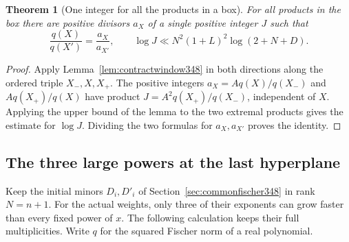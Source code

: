 \documentclass[a4paper,11pt]{article}
\newtheorem{theorem}[proposition]{Theorem}
\theoremstyle{definition}
\theoremstyle{remark}
\numberwithin{equation}{section}
\begin{document}
\begin{theorem}[One integer for all the products in a box]\leavevmode
\label{thm:commonfischer348}
For all products in the box there are positive divisors \(a_X\)
of a single positive integer \(J\) such that
\[
       \frac{q(X)}{q(X')}=\frac{a_X}{a_{X'}},\qquad
       \log J\ll N^2(1+L)^2\log(2+N+D) .
\]
\end{theorem}
\begin{proof}
Apply Lemma~\ref{lem:contractwindow348} in both directions along
the ordered triple \(X_-,X,X_+\). The positive integers
\(a_X=Aq(X)/q(X_-)\) and \(Aq(X_+)/q(X)\) have product
\(J=A^2 q(X_+)/q(X_-)\), independent of \(X\). Applying the
upper bound of the lemma to the two extremal products gives the
estimate for \(\log J\). Dividing the two formulas for
\(a_X,a_{X'}\) proves the identity.
\end{proof}


\subsection{The three large powers at the last hyperplane}\label{sec:threeminors349}

Keep the initial minors \(D_i,D'_i\) of Section~\ref{sec:commonfischer348}
in rank \(N=n+1\). For the actual weights, only three of their
exponents can grow faster than every fixed power of \(x\).
The following calculation keeps their full multiplicities. Write
\(q\) for the squared Fischer norm of a real polynomial.
\end{document}
